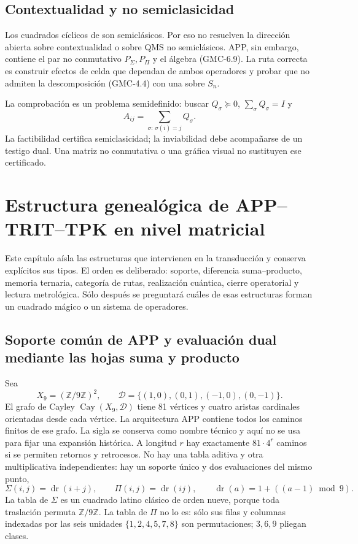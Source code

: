 \subsection{Contextualidad y no semiclasicidad}

Los cuadrados cíclicos de  son semiclásicos. Por eso no
resuelven la dirección abierta sobre contextualidad o sobre QMS no
semiclásicos. APP, sin embargo, contiene el par no conmutativo $P_\Sigma,P_\Pi$
y el álgebra \textup{(GMC-6.9)}. La ruta correcta es construir efectos de celda que
dependan de ambos operadores y probar que no admiten la descomposición
\textup{(GMC-4.4)} con una \POVM sobre $S_n$.

La comprobación es un problema semidefinido: buscar
$Q_\sigma\succeq0$, $\sum_\sigma Q_\sigma=I$ y
\[
 A_{ij}=\sum_{\sigma:\,\sigma(i)=j}Q_\sigma.
 \tag{GMC-8.6}
\]
La factibilidad certifica semiclasicidad; la inviabilidad debe acompañarse de
un testigo dual. Una matriz no conmutativa o una gráfica visual no sustituyen
ese certificado.


\section{Estructura genealógica de APP--TRIT--TPK en nivel matricial}
\label{p12-83-c22-s6:gmc:chap:hmt-profundidad}

Este capítulo aísla las estructuras que intervienen en la transducción y
conserva explícitos sus tipos. El orden es
deliberado: soporte, diferencia suma--producto, memoria ternaria, categoría de
rutas, realización cuántica, cierre operatorial y lectura metrológica. Sólo
después se preguntará cuáles de esas estructuras forman un cuadrado mágico o
un sistema de operadores.

\subsection{Soporte común de APP y evaluación dual mediante las hojas suma y producto}

Sea
\[
 X_9=(\mathbb Z/9\mathbb Z)^2,
 \qquad
 \mathscr D=\{(1,0),(0,1),(-1,0),(0,-1)\}.
\]
El grafo de Cayley $\operatorname{Cay}(X_9,\mathscr D)$ tiene 81 vértices y
cuatro aristas cardinales orientadas desde cada vértice. La arquitectura APP
contiene todos los caminos finitos de ese grafo. La sigla se conserva como
nombre técnico y aquí no se usa para fijar una expansión histórica. A longitud
$r$ hay exactamente $81\cdot4^r$ caminos si se permiten retornos y
retrocesos. No hay una tabla aditiva y otra multiplicativa independientes:
hay un soporte único y dos evaluaciones del mismo punto,
\[
 \Sigma(i,j)=\operatorname{dr}(i+j),
 \qquad
 \Pi(i,j)=\operatorname{dr}(ij),
 \qquad
 \operatorname{dr}(a)=1+((a-1)\bmod9).
 \tag{GMC-2.1}
\]
La tabla de $\Sigma$ es un cuadrado latino clásico de orden nueve, porque
toda traslación permuta $\mathbb Z/9\mathbb Z$. La tabla de $\Pi$ no lo es:
sólo sus filas y columnas indexadas por las seis unidades
$\{1,2,4,5,7,8\}$ son permutaciones; $3,6,9$ pliegan clases.

